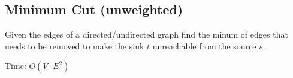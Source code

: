 \subsection{Minimum Cut (unweighted)}

Given the edges of a directed/undirected graph find the minum of edges that needs to be removed to make the sink $t$ unreachable from the source $s$.


Time: $O(V \cdot E^2)$
